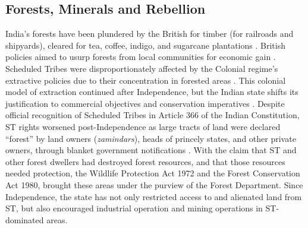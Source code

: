 \documentclass[12pt,reqno]{article}
\begin{document}
\subsection{Forests, Minerals and Rebellion \label{mining}}

India's forests have been plundered by the British for timber (for railroads and shipyards), cleared for tea, coffee, indigo, and sugarcane plantations \parencite{gadgil1992fissured}. British policies aimed to usurp forests from local communities for economic gain \parencite{Sundar2007}. Scheduled Tribes were disproportionately affected by the Colonial regime's extractive policies due to their concentration in forested areas \parencite{Patnaik2007-ku}. This colonial model of extraction continued after Independence, but the Indian state shifts its justification to commercial objectives and conservation imperatives \parencite{gadgil1992fissured}. Despite official recognition of Scheduled Tribes in Article 366 of the Indian Constitution, ST rights worsened post-Independence as large tracts of land were declared ``forest'' by land owners (\emph{zamindars}), heads of princely states, and other private owners, through blanket government notifications \parencite[5]{Patnaik2007-ku}. With the claim that ST and other forest dwellers had destroyed forest resources, and that those resources needed protection, the Wildlife Protection Act 1972 and the Forest Conservation Act 1980, brought these areas under the purview of the Forest Department.  
Since Independence, the state has not only restricted access to and alienated land from ST, but also encouraged industrial operation and mining operations in ST-dominated areas. 

\end{document}
